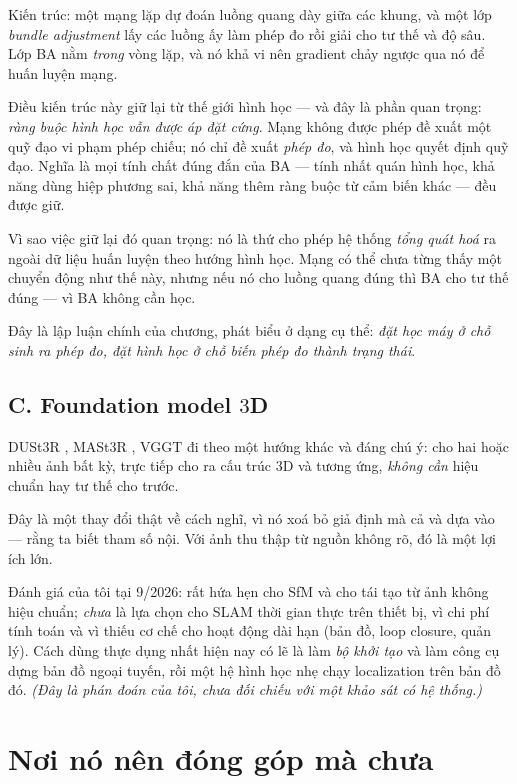 \documentclass[../../vslam.tex]{subfiles}
\begin{document}
Kiến trúc: một mạng lặp dự đoán luồng quang dày giữa các khung, và một lớp \emph{bundle adjustment} lấy các luồng ấy làm phép đo rồi giải cho tư thế và độ sâu. Lớp BA nằm \emph{trong} vòng lặp, và nó khả vi nên gradient chảy ngược qua nó để huấn luyện mạng.

Điều kiến trúc này giữ lại từ thế giới hình học --- và đây là phần quan trọng: \emph{ràng buộc hình học vẫn được áp đặt cứng}. Mạng không được phép đề xuất một quỹ đạo vi phạm phép chiếu; nó chỉ đề xuất \emph{phép đo}, và hình học quyết định quỹ đạo. Nghĩa là mọi tính chất đúng đắn của BA --- tính nhất quán hình học, khả năng dùng hiệp phương sai, khả năng thêm ràng buộc từ cảm biến khác --- đều được giữ.

Vì sao việc giữ lại đó quan trọng: nó là thứ cho phép hệ thống \emph{tổng quát hoá} ra ngoài dữ liệu huấn luyện theo hướng hình học. Mạng có thể chưa từng thấy một chuyển động như thế này, nhưng nếu nó cho luồng quang đúng thì BA cho tư thế đúng --- vì BA không cần học.

Đây là lập luận chính của chương, phát biểu ở dạng cụ thể: \emph{đặt học máy ở chỗ sinh ra phép đo, đặt hình học ở chỗ biến phép đo thành trạng thái}.

\subsection{C. Foundation model \(3\)D}

DUSt3R \cite{wang2024dust3r}, MASt3R \cite{leroy2024mast3r}, VGGT \cite{wang2025vggt} đi theo một hướng khác và đáng chú ý: cho hai hoặc nhiều ảnh bất kỳ, trực tiếp cho ra cấu trúc \(3\)D và tương ứng, \emph{không cần} hiệu chuẩn hay tư thế cho trước.

Đây là một thay đổi thật về cách nghĩ, vì nó xoá bỏ giả định mà cả  và  dựa vào --- rằng ta biết tham số nội. Với ảnh thu thập từ nguồn không rõ, đó là một lợi ích lớn.

Đánh giá của tôi tại 9/2026: rất hứa hẹn cho SfM và cho tái tạo từ ảnh không hiệu chuẩn; \emph{chưa} là lựa chọn cho SLAM thời gian thực trên thiết bị, vì chi phí tính toán và vì thiếu cơ chế cho hoạt động dài hạn (bản đồ, loop closure, quản lý). Cách dùng thực dụng nhất hiện nay có lẽ là làm \emph{bộ khởi tạo} và làm công cụ dựng bản đồ ngoại tuyến, rồi một hệ hình học nhẹ chạy localization trên bản đồ đó. \emph{(Đây là phán đoán của tôi, chưa đối chiếu với một khảo sát có hệ thống.)}

\section{Nơi nó nên đóng góp mà chưa}
\end{document}
